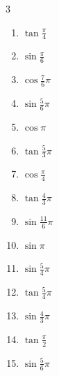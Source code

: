 \begin{multicols}{3}
\begin{enumerate}
  \item $\displaystyle \tan{\frac{\pi}{4}}$
        \phantom{$\displaystyle =1$}

  \item $\displaystyle \sin{\frac{\pi}{6}}$

  \item $\displaystyle \cos{\frac{7}{6}\pi}$

  \item $\displaystyle \sin{\frac{5}{6}\pi}$

  \item $\displaystyle \cos{\pi}$
        \phantom{$\displaystyle =-1$}

  \item $\displaystyle \tan{\frac{5}{3}\pi}$

\columnbreak %

  \item $\displaystyle \cos{\frac{\pi}{4}}$

  \item $\displaystyle \tan{\frac{4}{3}\pi}$

  \item $\displaystyle \sin{\frac{11}{6}\pi}$

  \item $\displaystyle \sin{\pi}$
        \phantom{$\displaystyle =0$}

  \item $\displaystyle \sin{\frac{5}{4}\pi}$

  \item $\displaystyle \tan{\frac{5}{4}\pi}$
        \phantom{$\displaystyle =1$}

  \item $\displaystyle \sin{\frac{4}{3}\pi}$

  \item $\displaystyle \tan{\frac{\pi}{2}}$
        \phantom{$\displaystyle \quad なし$}

  \item $\displaystyle \sin{\frac{5}{6}\pi}$


\end{enumerate}
\end{multicols}
